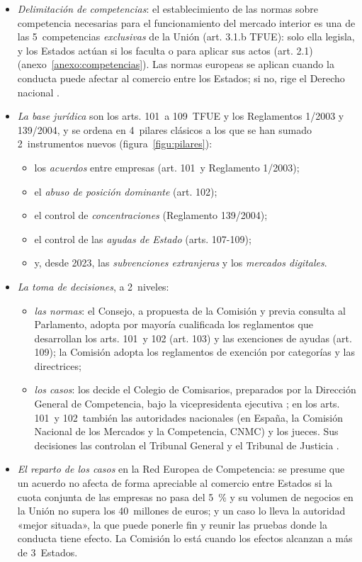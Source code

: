 \documentclass[11pt]{article}
\begin{document}
\begin{itemize}
\item \emph{Delimitación de competencias}: el establecimiento de las normas sobre competencia necesarias para el funcionamiento del mercado interior es una de las 5~competencias \emph{exclusivas} de la Unión (art. 3.1.b TFUE): solo ella legisla, y los Estados actúan si los faculta o para aplicar sus actos (art. 2.1) (anexo~\ref{anexo:competencias}). Las normas europeas se aplican cuando la conducta puede afectar al comercio entre los Estados; si no, rige el Derecho nacional .
\item \emph{La base jurídica} son los arts. 101~a 109~TFUE y los Reglamentos 1/2003 y 139/2004, y se ordena en 4~pilares clásicos a los que se han sumado 2~instrumentos nuevos (figura~\ref{figu:pilares}):
  \begin{itemize}
  \item los \emph{acuerdos} entre empresas (art. 101~y Reglamento 1/2003);
  \item el \emph{abuso de posición dominante} (art. 102);
  \item el control de \emph{concentraciones} (Reglamento 139/2004);
  \item el control de las \emph{ayudas de Estado} (arts. 107-109);
  \item y, desde 2023, las \emph{subvenciones extranjeras} y los \emph{mercados digitales}.
  \end{itemize}
\item \emph{La toma de decisiones}, a 2~niveles:
  \begin{itemize}
  \item \emph{las normas}: el Consejo, a propuesta de la Comisión y previa consulta al Parlamento, adopta por mayoría cualificada los reglamentos que desarrollan los arts. 101~y 102 (art. 103) y las exenciones de ayudas (art. 109); la Comisión adopta los reglamentos de exención por categorías y las directrices;
  \item \emph{los casos}: los decide el Colegio de Comisarios, preparados por la Dirección General de Competencia, bajo la vicepresidenta ejecutiva ; en los arts. 101~y 102~también las autoridades nacionales (en España, la Comisión Nacional de los Mercados y la Competencia, CNMC) y los jueces. Sus decisiones las controlan el Tribunal General y el Tribunal de Justicia .
  \end{itemize}
\item \emph{El reparto de los casos} en la Red Europea de Competencia: se presume que un acuerdo no afecta de forma apreciable al comercio entre Estados si la cuota conjunta de las empresas no pasa del 5~\% y su volumen de negocios en la Unión no supera los 40~millones de euros; y un caso lo lleva la autoridad «mejor situada», la que puede ponerle fin y reunir las pruebas donde la conducta tiene efecto. La Comisión lo está cuando los efectos alcanzan a más de 3~Estados\nocite{CE2004Red}.

\end{itemize}
\end{document}
